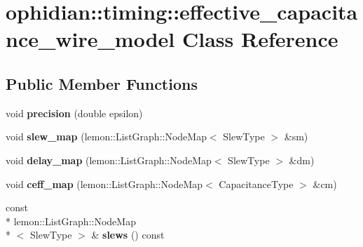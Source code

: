 \hypertarget{classophidian_1_1timing_1_1effective__capacitance__wire__model}{\section{ophidian\-:\-:timing\-:\-:effective\-\_\-capacitance\-\_\-wire\-\_\-model Class Reference}
\label{classophidian_1_1timing_1_1effective__capacitance__wire__model}
}
\subsection*{Public Member Functions}
\begin{DoxyCompactItemize}
\item 
\hypertarget{classophidian_1_1timing_1_1effective__capacitance__wire__model_aa18d4d2dd3dbc66a65fbcd746c638632}{void {\bfseries precision} (double epsilon)}\label{classophidian_1_1timing_1_1effective__capacitance__wire__model_aa18d4d2dd3dbc66a65fbcd746c638632}

\item 
\hypertarget{classophidian_1_1timing_1_1effective__capacitance__wire__model_ae38681e3edd43d0bac7efbd7293cbc89}{void {\bfseries slew\-\_\-map} (lemon\-::\-List\-Graph\-::\-Node\-Map$<$ Slew\-Type $>$ \&sm)}\label{classophidian_1_1timing_1_1effective__capacitance__wire__model_ae38681e3edd43d0bac7efbd7293cbc89}

\item 
\hypertarget{classophidian_1_1timing_1_1effective__capacitance__wire__model_a1fa3ef063233d16e21b94f910802cc9b}{void {\bfseries delay\-\_\-map} (lemon\-::\-List\-Graph\-::\-Node\-Map$<$ Slew\-Type $>$ \&dm)}\label{classophidian_1_1timing_1_1effective__capacitance__wire__model_a1fa3ef063233d16e21b94f910802cc9b}

\item 
\hypertarget{classophidian_1_1timing_1_1effective__capacitance__wire__model_a414dc2fd42b2b51b2a2e29f19f5ed1d8}{void {\bfseries ceff\-\_\-map} (lemon\-::\-List\-Graph\-::\-Node\-Map$<$ Capacitance\-Type $>$ \&cm)}\label{classophidian_1_1timing_1_1effective__capacitance__wire__model_a414dc2fd42b2b51b2a2e29f19f5ed1d8}

\item 
\hypertarget{classophidian_1_1timing_1_1effective__capacitance__wire__model_adcb954dded8db155b6b0a3f43444996e}{const \\*
lemon\-::\-List\-Graph\-::\-Node\-Map\\*
$<$ Slew\-Type $>$ \& {\bfseries slews} () const }\label{classophidian_1_1timing_1_1effective__capacitance__wire__model_adcb954dded8db155b6b0a3f43444996e}


\end{DoxyCompactItemize}
